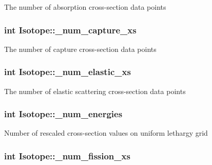 The number of absorption cross-\/section data points \hypertarget{classIsotope_ab4fb8d377328b23ae192dba57514ad40}{
\subsubsection[{\-\_\-num\-\_\-capture\-\_\-xs}]{\setlength{\rightskip}{0pt plus 5cm}int Isotope\-::\-\_\-num\-\_\-capture\-\_\-xs\hspace{0.3cm}{\ttfamily [private]}}}\label{classIsotope_ab4fb8d377328b23ae192dba57514ad40}
The number of capture cross-\/section data points \hypertarget{classIsotope_aeff29a44daea93ec2dfc06b39231afb7}{
\subsubsection[{\-\_\-num\-\_\-elastic\-\_\-xs}]{\setlength{\rightskip}{0pt plus 5cm}int Isotope\-::\-\_\-num\-\_\-elastic\-\_\-xs\hspace{0.3cm}{\ttfamily [private]}}}\label{classIsotope_aeff29a44daea93ec2dfc06b39231afb7}
The number of elastic scattering cross-\/section data points \hypertarget{classIsotope_ac4ce8fc4065448051ff608573c65c35d}{
\subsubsection[{\-\_\-num\-\_\-energies}]{\setlength{\rightskip}{0pt plus 5cm}int Isotope\-::\-\_\-num\-\_\-energies\hspace{0.3cm}{\ttfamily [private]}}}\label{classIsotope_ac4ce8fc4065448051ff608573c65c35d}
Number of rescaled cross-\/section values on uniform lethargy grid \hypertarget{classIsotope_a688301f0767515be67cf27b8f7cad9e3}{
\subsubsection[{\-\_\-num\-\_\-fission\-\_\-xs}]{\setlength{\rightskip}{0pt plus 5cm}int Isotope\-::\-\_\-num\-\_\-fission\-\_\-xs\hspace{0.3cm}{\ttfamily [private]}}}\label{classIsotope_a688301f0767515be67cf27b8f7cad9e3}

